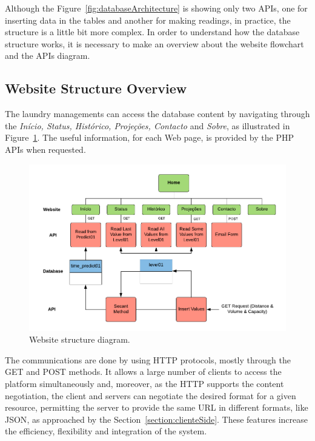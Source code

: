 Although the Figure~\ref{fig:databaseArchitecture} is showing only two \gls{API}s, one for inserting data in the tables and another for making readings, in practice, the structure is a little bit more complex. In order to understand how the database structure works, it is necessary to make an overview about the website flowchart and the \gls{API}s diagram.


\subsection{Website Structure Overview}

The laundry managements can access the database content by navigating through the \textit{Início, Status, Histórico, Projeções, Contacto} and \textit{Sobre}, as illustrated in Figure~\ref{fig:websiteDiagram}. The useful information, for each Web page, is provided by the \gls{PHP} \gls{API}s when requested.

\begin{figure}[h!]
    \centering
    \includegraphics[scale=0.95]{images/Development/web_database/api_flowchart.pdf}
    \caption{Website structure diagram.}
    \label{fig:websiteDiagram}
\end{figure}

The communications are done by using \gls{HTTP} protocols, mostly through the GET and POST methods. It allows a large number of clients to access the platform simultaneously and, moreover, as the \gls{HTTP} supports the content negotiation, the client and servers can negotiate the desired format for a given resource, permitting the server to provide the same \gls{URL} in different formats, like \gls{JSON}, as approached by the Section~\ref{section:clienteSide}. These features increase the efficiency, flexibility and integration of the system.

